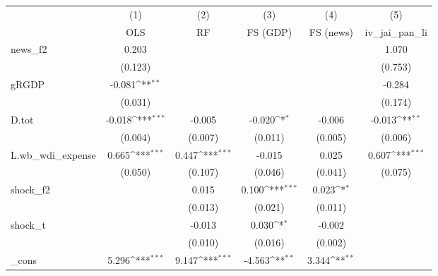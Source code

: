 {
\def\sym#1{\ifmmode^{#1}\else\(^{#1}\)\fi}
\begin{tabular}{l*{5}{c}}
\toprule
            &\multicolumn{1}{c}{(1)}&\multicolumn{1}{c}{(2)}&\multicolumn{1}{c}{(3)}&\multicolumn{1}{c}{(4)}&\multicolumn{1}{c}{(5)}\\
            &\multicolumn{1}{c}{OLS}&\multicolumn{1}{c}{RF}&\multicolumn{1}{c}{FS (GDP)}&\multicolumn{1}{c}{FS (news)}&\multicolumn{1}{c}{iv\_jai\_pan\_li}\\
\midrule
news\_f2     &       0.203         &                     &                     &                     &       1.070         \\
            &     (0.123)         &                     &                     &                     &     (0.753)         \\
\addlinespace
gRGDP       &      -0.081\sym{**} &                     &                     &                     &      -0.284         \\
            &     (0.031)         &                     &                     &                     &     (0.174)         \\
\addlinespace
D.tot       &      -0.018\sym{***}&      -0.005         &      -0.020\sym{*}  &      -0.006         &      -0.013\sym{**} \\
            &     (0.004)         &     (0.007)         &     (0.011)         &     (0.005)         &     (0.006)         \\
\addlinespace
L.wb\_wdi\_expense&       0.665\sym{***}&       0.447\sym{***}&      -0.015         &       0.025         &       0.607\sym{***}\\
            &     (0.050)         &     (0.107)         &     (0.046)         &     (0.041)         &     (0.075)         \\
\addlinespace
shock\_f2    &                     &       0.015         &       0.100\sym{***}&       0.023\sym{*}  &                     \\
            &                     &     (0.013)         &     (0.021)         &     (0.011)         &                     \\
\addlinespace
shock\_t     &                     &      -0.013         &       0.030\sym{*}  &      -0.002         &                     \\
            &                     &     (0.010)         &     (0.016)         &     (0.002)         &                     \\
\addlinespace
\_cons      &       5.296\sym{***}&       9.147\sym{***}&      -4.563\sym{**} &       3.344\sym{**} &                     \\

\end{tabular}}
